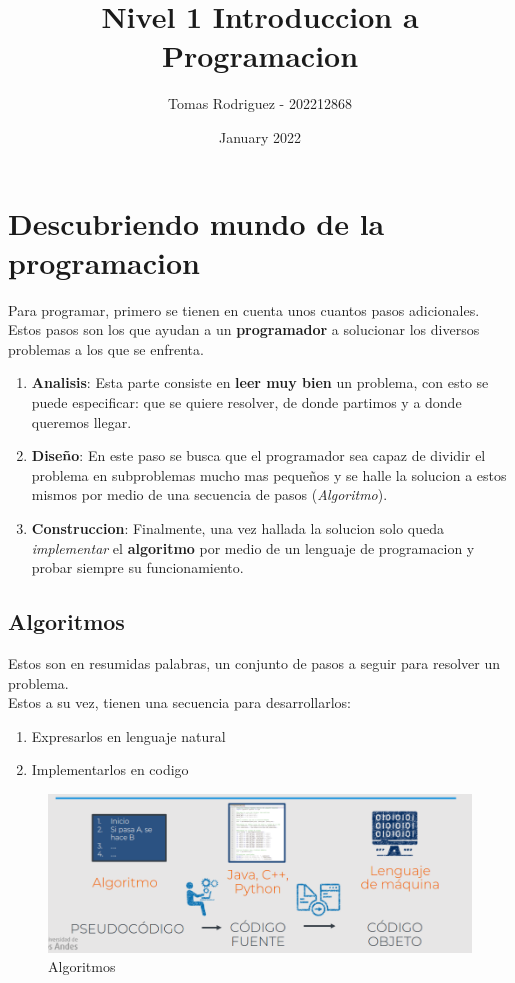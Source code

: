 \documentclass{article}
\title{Nivel 1 Introduccion a Programacion}
\author{Tomas Rodriguez - 202212868}
\date{January 2022}
\begin{document}
\maketitle
\section{Descubriendo mundo de la programacion}
Para programar, primero se tienen en cuenta unos cuantos pasos adicionales.\\
Estos pasos son los que ayudan a un \textbf{programador} a solucionar los diversos problemas a los que se enfrenta. 
\begin{enumerate}
    \item \textbf{Analisis}: Esta parte consiste en \textbf{leer muy bien} un problema, con esto se puede especificar: que se quiere resolver, de donde partimos y a donde queremos llegar. 
    \item \textbf{Diseño}: En este paso se busca que el programador sea capaz de dividir el problema en subproblemas mucho mas pequeños y se halle la solucion a estos mismos por medio de una secuencia de pasos (\textit{Algoritmo}).
    \item \textbf{Construccion}: Finalmente, una vez hallada la solucion solo queda \textit{implementar} el \textbf{algoritmo} por medio de un lenguaje de programacion y probar siempre su funcionamiento.
\end{enumerate}
\subsection{Algoritmos}
Estos son en resumidas palabras, un conjunto de pasos a seguir para resolver un problema.\\
Estos a su vez, tienen una secuencia para desarrollarlos:
\begin{enumerate}
    \item Expresarlos en lenguaje natural
    \item Implementarlos en codigo
\end{enumerate}
\begin{figure}[H]
    \centering
    \includegraphics[width=1\linewidth]{Algoritmos.png}
    \caption{Algoritmos}
    \label{fig:enter-label}
\end{figure}
\end{document}
